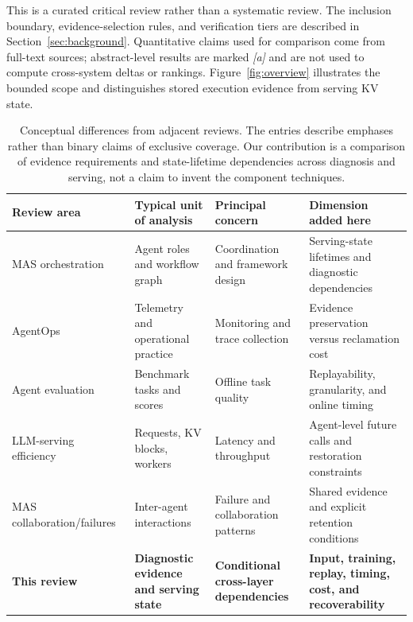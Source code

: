 This is a curated critical review rather than a systematic review. The inclusion boundary, evidence-selection rules, and verification tiers are described in Section~\ref{sec:background}. Quantitative claims used for comparison come from full-text sources; abstract-level results are marked \emph{[a]} and are not used to compute cross-system deltas or rankings. Figure~\ref{fig:overview} illustrates the bounded scope and distinguishes stored execution evidence from serving KV state.

\begin{table}[t]
\centering
\caption{Conceptual differences from adjacent reviews. The entries describe emphases rather than binary claims of exclusive coverage. Our contribution is a comparison of evidence requirements and state-lifetime dependencies across diagnosis and serving, not a claim to invent the component techniques.}
\label{tab:surveys}
\footnotesize
\begin{tabularx}{\textwidth}{@{}p{}p{}p{}X@{}}
\toprule
\textbf{Review area} & \textbf{Typical unit of analysis} & \textbf{Principal concern} & \textbf{Dimension added here} \\
\midrule
MAS orchestration~\cite{zhu2026orchestration} & Agent roles and workflow graph & Coordination and framework design & Serving-state lifetimes and diagnostic dependencies \\
AgentOps~\cite{agentopssurvey2025} & Telemetry and operational practice & Monitoring and trace collection & Evidence preservation versus reclamation cost \\
Agent evaluation~\cite{evalbenchmark2025} & Benchmark tasks and scores & Offline task quality & Replayability, granularity, and online timing \\
LLM-serving efficiency~\cite{latencysurvey2026} & Requests, KV blocks, workers & Latency and throughput & Agent-level future calls and restoration constraints \\
MAS collaboration/failures~\cite{beyondindiv2026} & Inter-agent interactions & Failure and collaboration patterns & Shared evidence and explicit retention conditions \\
\textbf{This review} & \textbf{Diagnostic evidence and serving state} & \textbf{Conditional cross-layer dependencies} & \textbf{Input, training, replay, timing, cost, and recoverability} \\
\bottomrule
\end{tabularx}
\end{table}

